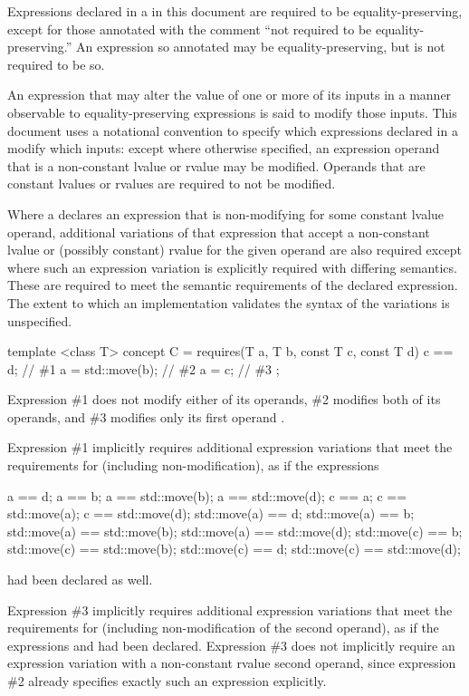 \pnum
Expressions declared in a  in this document are
required to be equality-preserving, except for those annotated with the comment
``not required to be equality-preserving.'' An expression so annotated
may be equality-preserving, but is not required to be so.

\pnum
An expression that may alter the value of one or more of its inputs in a manner
observable to equality-preserving expressions is said to modify those inputs.
This document uses a notational convention to specify which expressions declared
in a  modify which inputs: except where
otherwise specified, an expression operand that is a non-constant lvalue or
rvalue may be modified. Operands that are constant lvalues or rvalues are
required to not be modified.

\pnum
Where a  declares an expression that is
non-modifying for some constant lvalue operand, additional variations of that
expression that accept a non-constant lvalue or (possibly constant) rvalue for
the given operand are also required except where such an expression variation is
explicitly required with differing semantics. These
 are required to meet the semantic
requirements of the declared expression. The extent to which an implementation
validates the syntax of the variations is unspecified.

\begin{example}
\begin{codeblock}
template <class T>
concept C =
  requires(T a, T b, const T c, const T d) {
    c == d;           // \#1
    a = std::move(b); // \#2
    a = c;            // \#3
  };
\end{codeblock}

Expression \#1 does not modify either of its operands, \#2 modifies both of its
operands, and \#3 modifies only its first operand .

Expression \#1 implicitly requires additional expression variations that meet
the requirements for  (including non-modification), as if the
expressions
\begin{codeblock}
a == d;                       a == b;                       a == std::move(b); a == std::move(d);
c == a;                       c == std::move(a);            c == std::move(d);
std::move(a) == d;            std::move(a) == b;
std::move(a) == std::move(b); std::move(a) == std::move(d);
std::move(c) == b;            std::move(c) == std::move(b);
std::move(c) == d;            std::move(c) == std::move(d);
\end{codeblock}
had been declared as well.

Expression \#3 implicitly requires additional expression variations that meet
the requirements for  (including non-modification of the second
operand), as if the expressions  and  had
been declared. Expression \#3 does not implicitly require an expression
variation with a non-constant rvalue second operand, since expression \#2
already specifies exactly such an expression explicitly.
\end{example}


